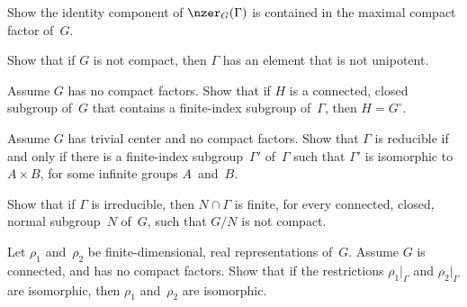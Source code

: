 \begin{exercises}
 \item \label{IdCompN(Gamma)inK}
 Show the identity component of $\nzer_G(\Gamma)$ is contained in the maximal compact factor of~$G$.

\item \label{GammaHasNonUnip}
 Show that if $G$ is not compact, then $\Gamma$ has an
element that is not unipotent.

\item \label{GammaNotinConn}
 Assume $G$ has no compact factors. Show that if $H$ is a
connected, closed subgroup of~$G$ that contains a finite-index
subgroup of~$\Gamma$, then $H = G^\circ$.

\item Assume $G$ has trivial center and no compact factors. Show
that $\Gamma$ is reducible if and only if there is a
finite-index subgroup~$\Gamma'$ of~$\Gamma$ such that
$\Gamma'$ is isomorphic to $A \times B$, for some infinite
groups $A$~and~$B$.\par
{}

\item \label{NcapGammaFinite}
 Show that if $\Gamma$ is irreducible, then $N \cap
\Gamma$ is finite, for every connected, closed,
normal subgroup~$N$ of~$G$, such that $G/N$ is not
compact. 
 
\item Let $\rho_1$ and~$\rho_2$ be finite-dimensional,
real representations of~$G$. Assume $G$ is connected, and has no compact
factors. Show that if the restrictions $\rho_1|_\Gamma$
and $\rho_2|_\Gamma$ are isomorphic, then $\rho_1$
and~$\rho_2$ are isomorphic.


\end{exercises}



